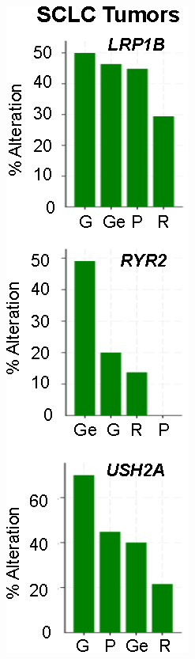 \begin{figure}[p]
    \centering
    \hspace{1cm}%
    \begin{subfigure}{0.17\textwidth}
        \includegraphics[width=\linewidth,keepaspectratio]{images/sclc/drivers_210}

\end{subfigure}
\end{figure}
